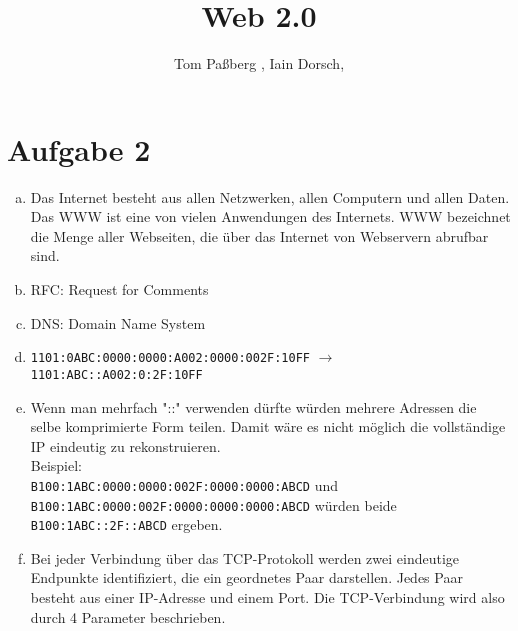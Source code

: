 \documentclass[a4paper]{scrartcl}
\title{Web 2.0}
\author{Tom Paßberg , Iain Dorsch, }
\begin{document}
\maketitle
\section*{Aufgabe 2}
\begin{enumerate}[a)]
    \item Das Internet besteht aus allen Netzwerken, allen Computern und allen Daten. Das WWW ist eine
    von vielen Anwendungen des Internets. WWW bezeichnet die Menge aller Webseiten, die über das Internet 
    von Webservern abrufbar sind.
    \item RFC: Request for Comments
    \item DNS: Domain Name System
    \item \texttt{1101:0ABC:0000:0000:A002:0000:002F:10FF} $\to$ \texttt{1101:ABC::A002:0:2F:10FF}
    \item Wenn man mehrfach "::" verwenden dürfte würden mehrere Adressen die selbe komprimierte Form 
    teilen. Damit wäre es nicht möglich die vollständige IP eindeutig zu rekonstruieren. \\
    Beispiel: \\
    \texttt{B100:1ABC:0000:0000:002F:0000:0000:ABCD} und \\
    \texttt{B100:1ABC:0000:002F:0000:0000:0000:ABCD} würden beide \\
    \texttt{B100:1ABC::2F::ABCD} ergeben.
    \item Bei jeder Verbindung über das TCP-Protokoll werden zwei eindeutige Endpunkte
    identifiziert, die ein geordnetes Paar darstellen. Jedes Paar besteht aus einer IP-Adresse und einem Port.
    Die TCP-Verbindung wird also durch 4 Parameter beschrieben.
\end{enumerate}
\end{document}
